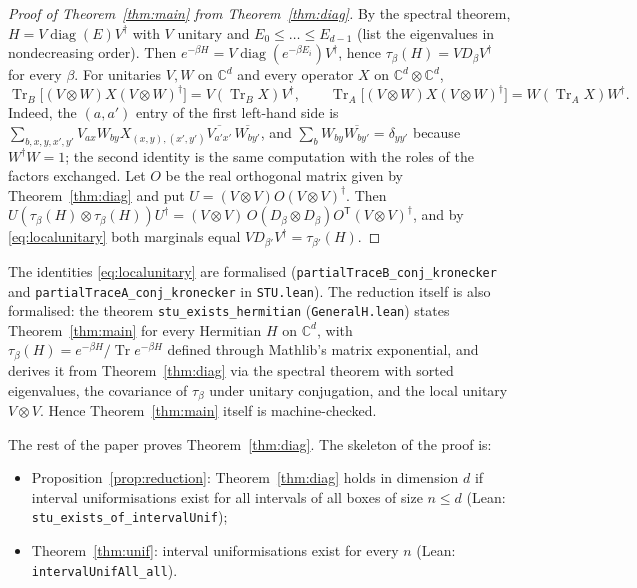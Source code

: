 \documentclass[11pt]{amsart}
\theoremstyle{definition}
\theoremstyle{remark}
\numberwithin{equation}{section}
\newcommand{\C}{\mathbb{C}}
\newcommand{\Tr}{\operatorname{Tr}}
\newcommand{\diag}{\operatorname{diag}}
\newcommand{\lean}[1]{\texttt{#1}}
\begin{document}
\begin{proof}[Proof of Theorem~\ref{thm:main} from Theorem~\ref{thm:diag}]
By the spectral theorem, $H=V\diag(E)V^\dagger$ with $V$ unitary and $E_0\le\dots\le E_{d-1}$ (list the
eigenvalues in nondecreasing order). Then $e^{-\beta H}=V\diag(e^{-\beta E_i})V^\dagger$, hence
$\tau_\beta(H)=VD_\beta V^\dagger$ for every $\beta$. For unitaries $V,W$ on $\C^d$ and every operator
$X$ on $\C^d\otimes\C^d$,
\begin{equation}\label{eq:localunitary}
  \Tr_B\bigl[(V\otimes W)X(V\otimes W)^\dagger\bigr]=V(\Tr_B X)V^\dagger,\qquad
  \Tr_A\bigl[(V\otimes W)X(V\otimes W)^\dagger\bigr]=W(\Tr_A X)W^\dagger .
\end{equation}
Indeed, the $(a,a')$ entry of the first left-hand side is
$\sum_{b,x,y,x',y'}V_{ax}W_{by}X_{(x,y),(x',y')}\overline{V_{a'x'}}\,\overline{W_{by'}}$, and
$\sum_b W_{by}\overline{W_{by'}}=\delta_{yy'}$ because $W^\dagger W=1$; the second identity is the same
computation with the roles of the factors exchanged. Let $O$ be the real orthogonal matrix given by
Theorem~\ref{thm:diag} and put $U=(V\otimes V)O(V\otimes V)^\dagger$. Then
$U(\tau_\beta(H)\otimes\tau_\beta(H))U^\dagger=(V\otimes V)\,O(D_\beta\otimes D_\beta)O^{\mathsf T}(V\otimes V)^\dagger$,
and by \eqref{eq:localunitary} both marginals equal $VD_{\beta'}V^\dagger=\tau_{\beta'}(H)$.
\end{proof}

The identities \eqref{eq:localunitary} are formalised (\lean{partialTraceB\_conj\_kronecker} and
\lean{partialTraceA\_conj\_kronecker} in \lean{STU.lean}). The reduction itself is also formalised: the
theorem \lean{stu\_exists\_hermitian} (\lean{GeneralH.lean}) states Theorem~\ref{thm:main} for every
Hermitian $H$ on $\C^d$, with $\tau_\beta(H)=e^{-\beta H}/\Tr e^{-\beta H}$ defined through Mathlib's matrix
exponential, and derives it from Theorem~\ref{thm:diag} via the spectral theorem with sorted eigenvalues,
the covariance of $\tau_\beta$ under unitary conjugation, and the local unitary $V\otimes V$. Hence
Theorem~\ref{thm:main} itself is machine-checked.

The rest of the paper proves Theorem~\ref{thm:diag}. The skeleton of the proof is:
\begin{itemize}
\item Proposition~\ref{prop:reduction}: Theorem~\ref{thm:diag} holds in dimension $d$ if interval
uniformisations exist for all intervals of all boxes of size $n\le d$ (Lean:
\lean{stu\_exists\_of\_intervalUnif});
\item Theorem~\ref{thm:unif}: interval uniformisations exist for every $n$ (Lean:
\lean{intervalUnifAll\_all}).
\end{itemize}
\end{document}
